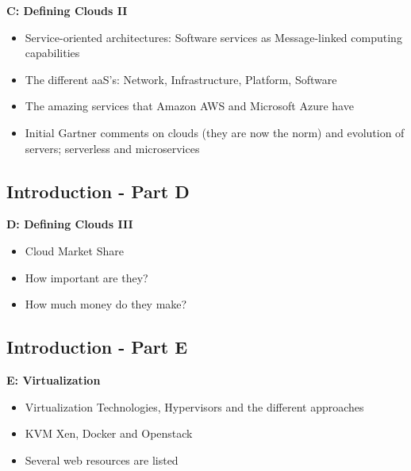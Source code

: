 
\textbf{C: Defining Clouds II}

\begin{itemize}
\item Service-oriented architectures: Software services as
  Message-linked computing capabilities
\item The different aaS’s: Network, Infrastructure, Platform, Software
\item The amazing services that Amazon AWS and Microsoft Azure have
\item Initial Gartner comments on clouds (they are now the norm) and
  evolution of servers; serverless and microservices

\end{itemize}

\subsection{Introduction - Part D}\label{s:cloud-fundamentals-d}



\textbf{D: Defining Clouds III}
\begin{itemize}
\item Cloud Market Share
\item How important are they?
\item How much money do they make?
\end{itemize}

\subsection{Introduction - Part E}\label{s:cloud-fundamentals-e}

\textbf{E: Virtualization}
\begin{itemize}
\item Virtualization Technologies, Hypervisors and the different
  approaches
\item KVM Xen, Docker and Openstack
\item Several web resources are listed
\end{itemize}

